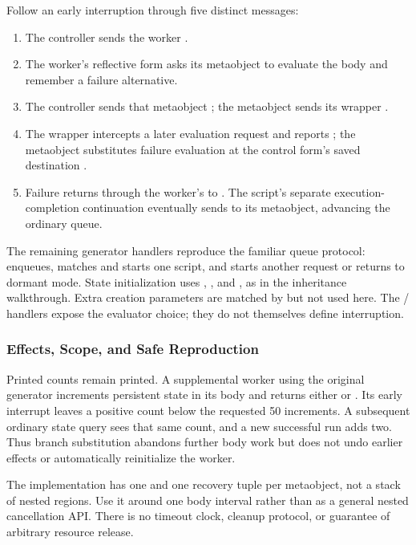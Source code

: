 Follow an early interruption through five distinct messages:

\begin{enumerate}
  \item The controller sends the worker .
  \item The worker's reflective form asks its metaobject to evaluate the
  body and remember a failure alternative.
  \item The controller sends that metaobject \code{[:interrupt]}; the
  metaobject sends its wrapper \code{[:interrupt Me]}.
  \item The wrapper intercepts a later evaluation request and reports
  ; the metaobject substitutes failure evaluation at
  the control form's saved destination .
  \item Failure returns through the worker's \code{!} to .
  The script's separate execution-completion continuation eventually
  sends  to its metaobject, advancing the ordinary queue.
\end{enumerate}

The remaining generator handlers reproduce the familiar queue protocol:
 enqueues,  matches and starts one script,
and  starts another request or returns to dormant mode.
State initialization uses , , and
, as in the inheritance walkthrough. Extra creation
parameters are matched by  but not used here. The
/ handlers expose the evaluator
choice; they do not themselves define interruption.

\subsubsection{Effects, Scope, and Safe Reproduction}

Printed counts remain printed. A supplemental worker using the original
generator increments persistent state in its body and returns either
 or . Its early interrupt
leaves a positive count below the requested 50 increments. A subsequent
ordinary state query sees that same count, and a new successful run adds
two. Thus branch substitution abandons further body work but does not
undo earlier effects or automatically reinitialize the worker.

The implementation has one  and one recovery tuple per
metaobject, not a stack of nested regions. Use it around one body interval
rather than as a general nested cancellation API. There is no timeout clock, cleanup
protocol, or guarantee of arbitrary resource release.

